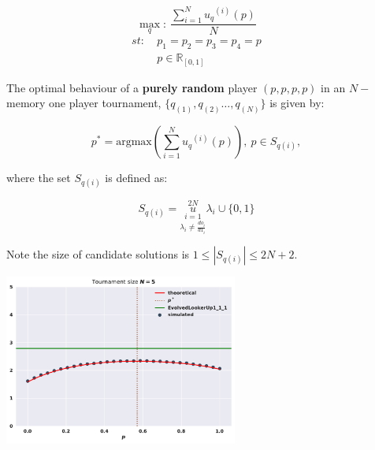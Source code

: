 \documentclass[usenames,dvipsnames,t]{beamer}
\newcommand{\R}{\mathbb{R}}
\begin{document}
\begin{columns}
\begin{column}{.45\linewidth}
        \[\max_q: \ \frac{\sum_{i=1} ^ {N} {u_q}^{(i)} (p)}{N}\]
        \begin{equation*}
            \begin{aligned}
            st: & \ p_1 = p_2 = p_3 = p_4 = p\\
                & \ p \in \R_{[0, 1]} 
            \end{aligned}
            \end{equation*}
            \vspace{0.5cm}

            \small{
            The optimal behaviour of a \textbf{purely random} player \((p, p, p, p)\)
            in an \(N-\)memory one player tournament, \(\{q_{(1)}, q_{(2)} \dots,q_{(N)} \}
            \) is given by:}
            \vspace{0.3cm}

            \[p^* = \text{argmax}(\displaystyle \sum_{i=1} ^ {N} {u_q}^{(i)} (p)), \ p \in S_{q(i)},\]
            \vspace{0.3cm}
            
            \small{
            where the set \(S_{q(i)}\) is defined as:}
            
            \[ S_{q(i)} =  \overset{2N}{\underset{\lambda_i \neq \frac{do_i}{d1_i}}{\underset{i=1}{u}}} \lambda_i \cup \{0, 1\} \]
            \vspace{0.3cm}

            Note the size of candidate solutions is \( 1 \leq|S_{q(i)}| \leq 2N + 2\).
            \vspace{0.3cm}

            \begin{center}
                \includegraphics[width=0.6\textwidth]{static/random_vs_multiple}
            \end{center}
            \vspace{0.3cm}
    \end{column}
    \begin{column}{.03\linewidth}
    \end{column}
\end{columns}
\end{document}
